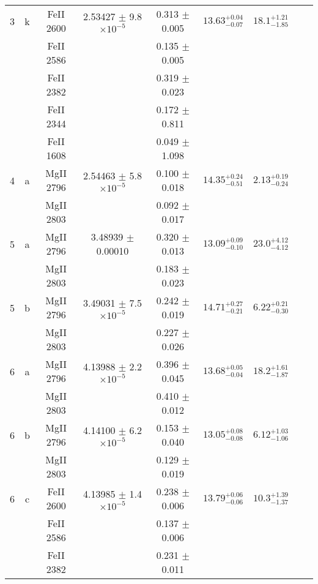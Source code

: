 \documentclass[12pt]{article}
\begin{document}
\begin{footnotesize}
\begin{longtable}{ c c c c c c c c c}
       3  & k  & FeII     2600  &  2.53427 $\pm$ 9.8 $\times 10^{-5}$   &  0.313 $\pm$ 0.005   & $13.63_{ - 0.07}^{ + 0.04}$  & $18.1_{ - 1.85}^{ + 1.21}$    & 	 & \\ 
  &   & FeII     2586  &  &  0.135 $\pm$ 0.005   &   &     & 	 & \\ 
  &   & FeII     2382  &  &  0.319 $\pm$ 0.023   &   &     & 	 & \\ 
  &   & FeII     2344  &  &  0.172 $\pm$ 0.811   &   &     & 	 & \\ 
  &   & FeII     1608  &  &  0.049 $\pm$ 1.098   &   &     & 	 & \\ 
       4  & a  & MgII     2796  &  2.54463 $\pm$ 5.8 $\times 10^{-5}$   &  0.100 $\pm$ 0.018   & $14.35_{ - 0.51}^{ + 0.24}$  & $2.13_{ - 0.24}^{ + 0.19}$    & 	 & \\ 
  &   & MgII     2803  &  &  0.092 $\pm$ 0.017   &   &     & 	 & \\ 
       5  & a  & MgII     2796  &  3.48939 $\pm$ 0.00010  &  0.320 $\pm$ 0.013   & $13.09_{ - 0.10}^{ + 0.09}$  & $23.0_{ - 4.12}^{ + 4.12}$    & 	 & \\ 
  &   & MgII     2803  &  &  0.183 $\pm$ 0.023   &   &     & 	 & \\ 
       5  & b  & MgII     2796  &  3.49031 $\pm$ 7.5 $\times 10^{-5}$   &  0.242 $\pm$ 0.019   & $14.71_{ - 0.21}^{ + 0.27}$  & $6.22_{ - 0.30}^{ + 0.21}$    & 	 & \\ 
  &   & MgII     2803  &  &  0.227 $\pm$ 0.026   &   &     & 	 & \\ 
       6  & a  & MgII     2796  &  4.13988 $\pm$ 2.2 $\times 10^{-5}$   &  0.396 $\pm$ 0.045   & $13.68_{ - 0.04}^{ + 0.05}$  & $18.2_{ - 1.87}^{ + 1.61}$    & 	 & \\ 
  &   & MgII     2803  &  &  0.410 $\pm$ 0.012   &   &     & 	 & \\ 
       6  & b  & MgII     2796  &  4.14100 $\pm$ 6.2 $\times 10^{-5}$   &  0.153 $\pm$ 0.040   & $13.05_{ - 0.08}^{ + 0.08}$  & $6.12_{ - 1.06}^{ + 1.03}$    & 	 & \\ 
  &   & MgII     2803  &  &  0.129 $\pm$ 0.019   &   &     & 	 & \\ 
       6  & c  & FeII     2600  &  4.13985 $\pm$ 1.4 $\times 10^{-5}$   &  0.238 $\pm$ 0.006   & $13.79_{ - 0.06}^{ + 0.06}$  & $10.3_{ - 1.37}^{ + 1.39}$    & 	 & \\ 
  &   & FeII     2586  &  &  0.137 $\pm$ 0.006   &   &     & 	 & \\ 
  &   & FeII     2382  &  &  0.231 $\pm$ 0.011   &   &     & 	 & \\ 

\end{longtable}
\end{footnotesize}
\end{document}
